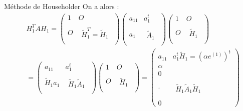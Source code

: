 \documentclass[french, 10pt]{beamer}
\theoremstyle{definition}
\begin{document}
\begin{frame}{Méthode de Householder}
	On a alors :
	$$
	\begin{aligned}
		& H_1^T A H_1=\left(\begin{array}{c|c}
			1 & O \\
			\hline O & \begin{array}{c} \quad \\ \tilde{H}_1^T=\tilde{H}_1 \\ \quad \end{array}
		\end{array}\right)\left(\begin{array}{c|c}
			a_{11} & a_1^t \\
			\hline a_1 & \begin{array}{c} \quad \\ \tilde{A}_1 \\ \quad \end{array}
		\end{array}\right)\left(\begin{array}{c|c}
			1 & O \\
			\hline O & \begin{array}{c} \quad \\ \tilde{H}_1 \\ \quad \end{array}
		\end{array}\right) \\
		& =\left(\begin{array}{c|c}
			a_{11} & a_1^t \\
			\hline \widetilde{H}_1 a_1 & \begin{array}{c} \quad \\ \widetilde{H}_1 \widetilde{A}_1 \\ \quad \end{array}
		\end{array}\right)\left(
		\begin{array}{c|c}
			1 & O \\  
			\hline O & \begin{array}{c} \quad \\ \tilde{H}_1 \\ \quad \end{array}
		\end{array}
		\right)=\left(\begin{array}{c|c}
			a_{11} & a_1^t \tilde{H}_1=\left(\alpha e^{(1)}\right)^t \\
			\hline
			\alpha \\ 0 \\ \cdot & \begin{array}{c} \quad \\ \widetilde{H}_1 \tilde{A}_1 \widetilde{H}_1 \\ \quad \end{array}  \\ 0   
		\end{array}\right)
	\end{aligned}
	$$
	
\end{frame}
\end{document}

